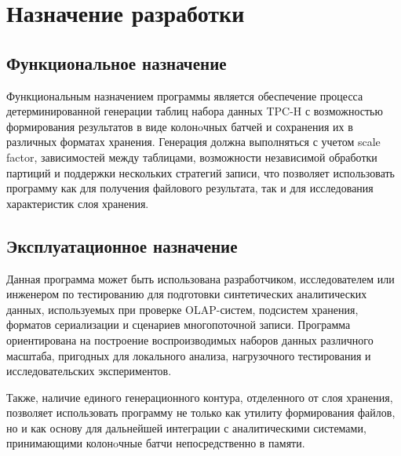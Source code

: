 \section{Назначение разработки}

\subsection{Функциональное назначение}

Функциональным назначением программы является обеспечение процесса детерминированной генерации таблиц набора данных TPC-H с возможностью формирования результатов в виде колонoчных батчей и сохранения их в различных форматах хранения. Генерация должна выполняться с учетом scale factor, зависимостей между таблицами, возможности независимой обработки партиций и поддержки нескольких стратегий записи, что позволяет использовать программу как для получения файлового результата, так и для исследования характеристик слоя хранения.

\subsection{Эксплуатационное назначение}

Данная программа может быть использована разработчиком, исследователем или инженером по тестированию для подготовки синтетических аналитических данных, используемых при проверке OLAP-систем, подсистем хранения, форматов сериализации и сценариев многопоточной записи. Программа ориентирована на построение воспроизводимых наборов данных различного масштаба, пригодных для локального анализа, нагрузочного тестирования и исследовательских экспериментов.

Также, наличие единого генерационного контура, отделенного от слоя хранения, позволяет использовать программу не только как утилиту формирования файлов, но и как основу для дальнейшей интеграции с аналитическими системами, принимающими колонoчные батчи непосредственно в памяти.
